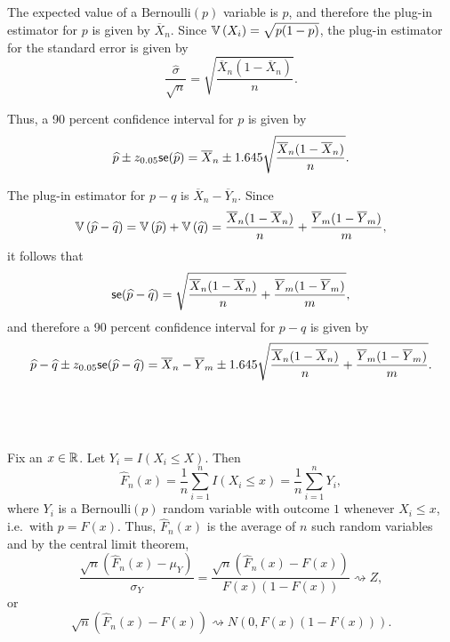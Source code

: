 \begin{ex}
  The expected value of a $\text{Bernoulli}(p)$ variable is $p$, and therefore
  the plug-in estimator for $p$ is given by $\overline{X}_n$. Since $\mathbb{V}\left(X_i\right)
    =\sqrt{p(1-p)}$, the plug-in estimator for the standard error is given
  by
  \[
    \frac{\widehat{\sigma}}{\sqrt{n}}
    =\sqrt{\frac{\overline{X}_n(1-\overline{X}_n)}{n}}.
  \]

  Thus, a 90 percent confidence interval for $p$ is given by
  \[
    \widehat{p}\pm z_{0.05}\textsf{se}(\widehat{p})
    =\overline{X}_n\pm 1.645\sqrt{\frac{\overline{X}_n(1-\overline{X}_n)}{n}}.
  \]

  The plug-in estimator for $p-q$ is $\overline{X}_n-\overline{Y}_n$. Since
  \[
    \mathbb{V}\left(\widehat{p}-\widehat{q}\right)
    =\mathbb{V}\left(\widehat{p}\right)+\mathbb{V}\left(\widehat{q}\right)
    =\frac{\overline{X}_n(1-\overline{X}_n)}{n}
    +\frac{\overline{Y}_m(1-\overline{Y}_m)}{m},
  \]
  it follows that
  \[
    \textsf{se}(\widehat{p}-\widehat{q})
    =\sqrt{\frac{\overline{X}_n(1-\overline{X}_n)}{n}
      +\frac{\overline{Y}_m(1-\overline{Y}_m)}{m}},
  \]
  and therefore a 90 percent confidence interval for $p-q$ is given by
  \[
    \widehat{p}-\widehat{q}
    \pm z_{0.05}\textsf{se}(\widehat{p}-\widehat{q})
    =\overline{X}_n-\overline{Y}_m\pm
    1.645\sqrt{\frac{\overline{X}_n(1-\overline{X}_n)}{n}
      +\frac{\overline{Y}_m(1-\overline{Y}_m)}{m}}.
  \]
\end{ex}

\begin{ex}~
  \inputminted{python}{../code/07-03.py}
  \inputminted{text}{../output/07-03.txt}
\end{ex}

\begin{ex}
  Fix an $x\in\mathbb{R}$. Let $Y_i=I(X_i\leq X)$. Then
  \[
    \widehat{F}_n(x)
    =\frac{1}{n}\sum_{i=1}^nI(X_i\leq x)
    =\frac{1}{n}\sum_{i=1}^nY_i,
  \]
  where $Y_i$ is a $\text{Bernoulli}(p)$ random variable with outcome $1$
  whenever $X_i \leq x$, i.e.\ with $p=F(x)$. Thus, $\widehat{F}_n(x)$
  is the average of $n$ such random variables and by the central limit theorem,
  \[
    \frac{\sqrt{n}(\widehat{F}_n(x)-\mu_Y)}{\sigma_Y}
    =\frac{\sqrt{n}(\widehat{F}_n(x)-F(x))}{F(x)(1-F(x))}
    \rightsquigarrow Z,
  \]
  or
  \[
    \sqrt{n}\left(\widehat{F}_n(x)-F(x)\right)
    \rightsquigarrow N\left(0, F(x)(1-F(x))\right).
  \]
\end{ex}


